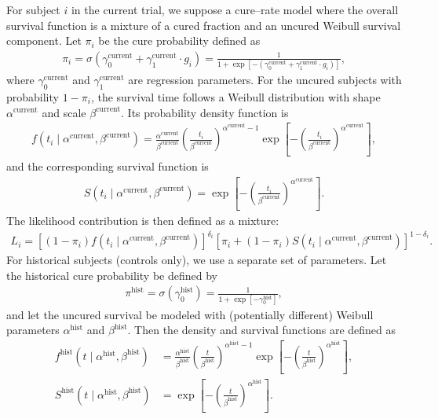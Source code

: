 \documentclass[12pt]{article}
\begin{document}
For subject $i$ in the current trial, we suppose a cure–rate model where the overall survival function is a mixture of a cured fraction and an uncured Weibull survival component.
Let $\pi_i$ be the cure probability defined as
\begin{align*}
    \pi_i = \sigma\left(\gamma_0^{\text{current}} + \gamma_1^{\text{current}}\cdot g_i\right) = \frac{1}{1 + \exp\left[-(\gamma_0^{\text{current}} + \gamma_1^{\text{current}} \cdot g_i)\right]},
\end{align*}
where $\gamma_0^{\text{current}}$ and $\gamma_1^{\text{current}}$ are regression parameters.
For the uncured subjects with probability $1 - \pi_i$, the survival time follows a Weibull distribution with shape $\alpha^{\text{current}}$ and scale $\beta^{\text{current}}$.
Its probability density function is
\begin{align*}
    f(t_i \mid \alpha^{\text{current}}, \beta^{\text{current}}) = \frac{\alpha^{\text{current}}}{\beta^{\text{current}}}\left(\frac{t_i}{\beta^{\text{current}}}\right)^{\alpha^{\text{current}} - 1}\exp\left[-\left(\frac{t_i}{\beta^{\text{current}}}\right)^{\alpha^{\text{current}}}\right],
\end{align*}
and the corresponding survival function is
\begin{align*}
    S(t_i \mid \alpha^{\text{current}}, \beta^{\text{current}}) = \exp\left[-\left(\frac{t_i}{\beta^{\text{current}}}\right)^{\alpha^{\text{current}}}\right].
\end{align*}
The likelihood contribution is then defined as a mixture:
\begin{align*}
    L_i = \left[(1 - \pi_i)f(t_i \mid \alpha^{\text{current}}, \beta^{\text{current}})\right]^{\delta_i}\left[\pi_i + (1 - \pi_i)S(t_i \mid \alpha^{\text{current}}, \beta^{\text{current}})\right]^{1 - \delta_i}.
\end{align*}
For historical subjects (controls only), we use a separate set of parameters.
Let the historical cure probability be defined by
\begin{align*}
    \pi^{\text{hist}} = \sigma\left(\gamma_0^{\text{hist}}\right) = \frac{1}{1 + \exp\left[-\gamma_0^{\text{hist}}\right]},
\end{align*}
and let the uncured survival be modeled with (potentially different) Weibull parameters $\alpha^{\text{hist}}$ and $\beta^{\text{hist}}$.
Then the density and survival functions are defined as
\begin{align*}
    f^{\text{hist}}(t \mid \alpha^{\text{hist}}, \beta^{\text{hist}}) &= \frac{\alpha^{\text{hist}}}{\beta^{\text{hist}}}\left(\frac{t}{\beta^{\text{hist}}}\right)^{\alpha^{\text{hist}} - 1}\exp\left[-\left(\frac{t}{\beta^{\text{hist}}}\right)^{\alpha^{\text{hist}}}\right], \\
    S^{\text{hist}}(t \mid \alpha^{\text{hist}}, \beta^{\text{hist}}) &= \exp\left[-\left(\frac{t}{\beta^{\text{hist}}}\right)^{\alpha^{\text{hist}}}\right].
\end{align*}
\end{document}
